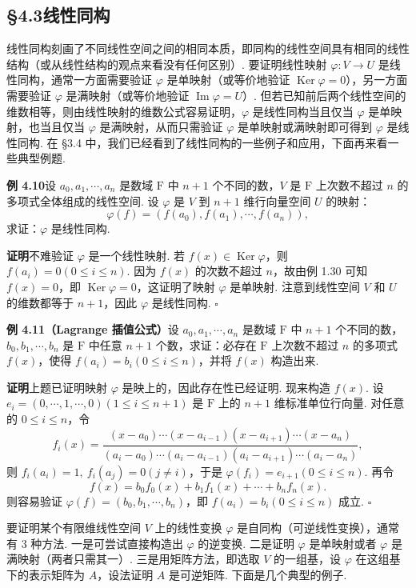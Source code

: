 \documentclass[UTF8, 12pt, fontset=fandol, oneside]{ctexart}
\begin{document}
\subsection*{§4.3\quad 线性同构}

线性同构刻画了不同线性空间之间的相同本质，即同构的线性空间具有相同的线性结构（或从线性结构的观点来看没有任何区别）. 要证明线性映射 $\varphi:V\to U$ 是线性同构，通常一方面需要验证 $\varphi$ 是单映射（或等价地验证 $\operatorname{Ker}\varphi=0$），另一方面需要验证 $\varphi$ 是满映射（或等价地验证 $\operatorname{Im}\varphi=U$）. 但若已知前后两个线性空间的维数相等，则由线性映射的维数公式容易证明，$\varphi$ 是线性同构当且仅当 $\varphi$ 是单映射，也当且仅当 $\varphi$ 是满映射，从而只需验证 $\varphi$ 是单映射或满映射即可得到 $\varphi$ 是线性同构. 在 §3.4 中，我们已经看到了线性同构的一些例子和应用，下面再来看一些典型例题.

\noindent\textbf{例 4.10}\quad 设 $a_0,a_1,\cdots,a_n$ 是数域 $\mathrm{F}$ 中 $n+1$ 个不同的数，$V$ 是 $\mathrm{F}$ 上次数不超过 $n$ 的多项式全体组成的线性空间. 设 $\varphi$ 是 $V$ 到 $n+1$ 维行向量空间 $U$ 的映射：
\[
\varphi(f)=(f(a_0),f(a_1),\cdots,f(a_n)),
\]
求证：$\varphi$ 是线性同构.

\noindent\textbf{证明}\quad 不难验证 $\varphi$ 是一个线性映射. 若 $f(x)\in\operatorname{Ker}\varphi$，则 $f(a_i)=0(0\le i\le n)$. 因为 $f(x)$ 的次数不超过 $n$，故由例 1.30 可知 $f(x)=0$，即 $\operatorname{Ker}\varphi=0$，这证明了映射 $\varphi$ 是单映射. 注意到线性空间 $V$ 和 $U$ 的维数都等于 $n+1$，因此 $\varphi$ 是线性同构. $\square$

\noindent\textbf{例 4.11（Lagrange 插值公式）}\quad 设 $a_0,a_1,\cdots,a_n$ 是数域 $\mathrm{F}$ 中 $n+1$ 个不同的数，$b_0,b_1,\cdots,b_n$ 是 $\mathrm{F}$ 中任意 $n+1$ 个数，求证：必存在 $\mathrm{F}$ 上次数不超过 $n$ 的多项式 $f(x)$，使得 $f(a_i)=b_i(0\le i\le n)$，并将 $f(x)$ 构造出来.

\noindent\textbf{证明}\quad 上题已证明映射 $\varphi$ 是映上的，因此存在性已经证明. 现来构造 $f(x)$. 设 $e_i=(0,\cdots,1,\cdots,0)(1\le i\le n+1)$ 是 $\mathrm{F}$ 上的 $n+1$ 维标准单位行向量. 对任意的 $0\le i\le n$，令
\[
f_i(x)=
\frac{(x-a_0)\cdots(x-a_{i-1})(x-a_{i+1})\cdots(x-a_n)}
{(a_i-a_0)\cdots(a_i-a_{i-1})(a_i-a_{i+1})\cdots(a_i-a_n)},
\]
则 $f_i(a_i)=1,\ f_i(a_j)=0(j\ne i)$，于是 $\varphi(f_i)=e_{i+1}(0\le i\le n)$. 再令
\[
f(x)=b_0f_0(x)+b_1f_1(x)+\cdots+b_nf_n(x).
\]
则容易验证 $\varphi(f)=(b_0,b_1,\cdots,b_n)$，即 $f(a_i)=b_i(0\le i\le n)$ 成立. $\square$

要证明某个有限维线性空间 $V$ 上的线性变换 $\varphi$ 是自同构（可逆线性变换），通常有 3 种方法. 一是可尝试直接构造出 $\varphi$ 的逆变换. 二是证明 $\varphi$ 是单映射或者 $\varphi$ 是满映射（两者只需其一）. 三是用矩阵方法，即选取 $V$ 的一组基，设 $\varphi$ 在这组基下的表示矩阵为 $A$，设法证明 $A$ 是可逆矩阵. 下面是几个典型的例子.
\end{document}
